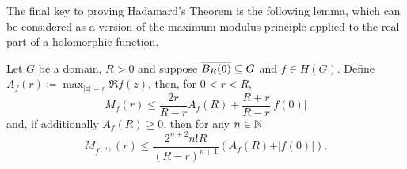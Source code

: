 The final key to proving Hadamard's Theorem is the following lemma, which can be considered as a version of the maximum modulus principle applied to the real part of a holomorphic function.

\begin{lemma} \label{lem:borel-caratheodory}
    Let $G$ be a domain, $R > 0$ and suppose $\overline{B_R(0)} \subseteq G$ and $f \in H(G)$. Define $ A_f(r) \coloneqq \max_{\vert z \vert = r} \Re f(z) $, then, for $0 < r < R$,
    \begin{equation} \label{eq:borel-caratheodory-1}
        M_f(r) \leq \frac{2r}{R - r} A_f(R) + \frac{R + r}{R - r} \vert f(0) \vert
    \end{equation}
    and, if additionally $A_f(R) \geq 0$, then for any $n \in \mathbb{N}$
    \begin{equation} \label{eq:borel-caratheodory-2}
        M_{f^{(n)}}(r) \leq \frac{2^{n+2} n! R}{(R - r)^{n+1}} (A_f(R) + \vert f(0) \vert).
    \end{equation}
\end{lemma}

